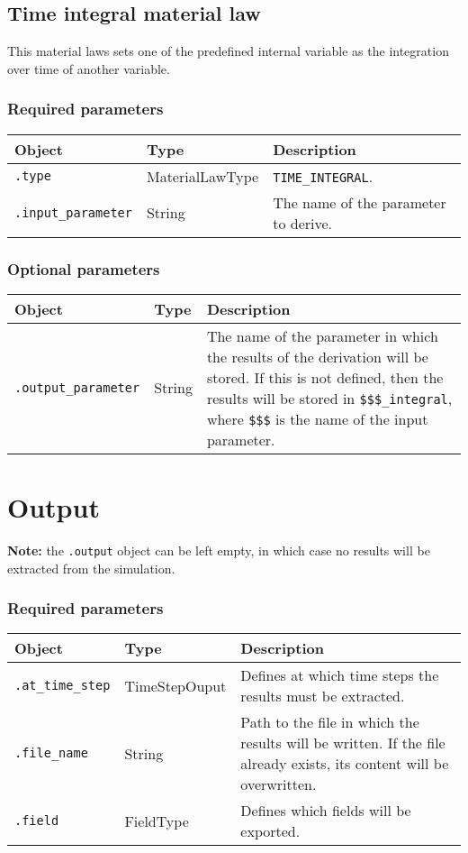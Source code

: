 \documentclass[10pt]{article}
\begin{document}
\subsection{Time integral material law}

This material laws sets one of the predefined internal variable as the integration over time of another variable.

\subsubsection*{Required parameters}

\begin{tabularx}{\textwidth}{llX}
\hline 
Object & Type & Description \\ 
\hline 
\verb+.type+ & MaterialLawType & \verb+TIME_INTEGRAL+. \\ 
\verb+.input_parameter+ & String & The name of the parameter to derive.\\
\hline 
\end{tabularx}

\subsubsection*{Optional parameters}

\begin{tabularx}{\textwidth}{llX}
\hline 
Object & Type & Description \\ 
\hline 
\verb+.output_parameter+ & String & The name of the parameter in which the results of the derivation will be stored. If this is not defined, then the results will be stored in \verb+$$$_integral+, where \verb+$$$+ is the name of the input parameter.\\
\hline 
\end{tabularx}

\section{Output}

\textbf{Note:} the \verb+.output+ object can be left empty, in which case no results will be extracted from the simulation.

\subsubsection*{Required parameters}

\begin{tabularx}{\textwidth}{llX}
\hline 
Object & Type & Description \\ 
\hline 
\verb+.at_time_step+ & TimeStepOuput & Defines at which time steps the results must be extracted. \\ 
\verb+.file_name+ & String & Path to the file in which the results will be written. If the file already exists, its content will be overwritten.\\ 
\verb+.field+ & FieldType & Defines which fields will be exported.\\
\hline 
\end{tabularx}
\end{document}
